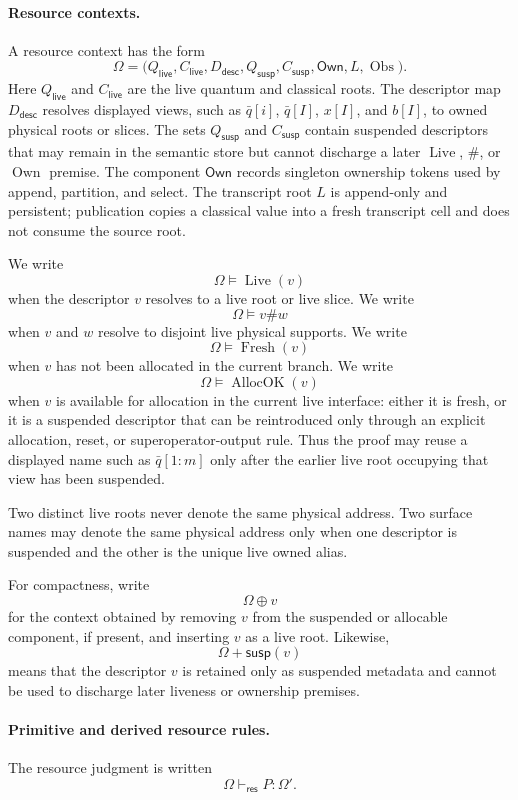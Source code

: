\documentclass{report}
\theoremstyle{defn_style}
\providecommand{\Live}{\operatorname{Live}}
\providecommand{\Fresh}{\operatorname{Fresh}}
\providecommand{\AllocOK}{\operatorname{AllocOK}}
\providecommand{\Own}{\operatorname{Own}}
\providecommand{\Obs}{\operatorname{Obs}}
\providecommand{\susp}{\mathsf{susp}}
\begin{document}
\paragraph{Resource contexts.}
A resource context has the form
\[
\Omega =
\bigl(
  Q_{\mathsf{live}},
  C_{\mathsf{live}},
  D_{\mathsf{desc}},
  Q_{\mathsf{susp}},
  C_{\mathsf{susp}},
  \mathsf{Own},
  L,
  \Obs
\bigr).
\]
Here \(Q_{\mathsf{live}}\) and \(C_{\mathsf{live}}\) are the live quantum and
classical roots.  The descriptor map \(D_{\mathsf{desc}}\) resolves displayed
views, such as \(\bar q[i]\), \(\bar q[I]\), \(x[I]\), and \(b[I]\), to owned
physical roots or slices.  The sets \(Q_{\mathsf{susp}}\) and
\(C_{\mathsf{susp}}\) contain suspended descriptors that may remain in the
semantic store but cannot discharge a later \(\Live\), \(\#\), or \(\Own\)
premise.  The component \(\mathsf{Own}\) records singleton ownership tokens used
by append, partition, and select.  The transcript root \(L\) is append-only and
persistent; publication copies a classical value into a fresh transcript cell and
does not consume the source root.

We write
\[
  \Omega \models \Live(v)
\]
when the descriptor \(v\) resolves to a live root or live slice.  We write
\[
  \Omega \models v \# w
\]
when \(v\) and \(w\) resolve to disjoint live physical supports.  We write
\[
  \Omega \models \Fresh(v)
\]
when \(v\) has not been allocated in the current branch.  We write
\[
  \Omega \models \AllocOK(v)
\]
when \(v\) is available for allocation in the current live interface: either it
is fresh, or it is a suspended descriptor that can be reintroduced only through
an explicit allocation, reset, or superoperator-output rule.  Thus the proof may
reuse a displayed name such as \(\bar q[1{:}m]\) only after the earlier live root
occupying that view has been suspended.

Two distinct live roots never denote the same physical address.  Two surface
names may denote the same physical address only when one descriptor is suspended
and the other is the unique live owned alias.

For compactness, write
\[
  \Omega\oplus v
\]
for the context obtained by removing \(v\) from the suspended or allocable
component, if present, and inserting \(v\) as a live root.  Likewise,
\[
  \Omega+\susp(v)
\]
means that the descriptor \(v\) is retained only as suspended metadata and cannot
be used to discharge later liveness or ownership premises.

\paragraph{Primitive and derived resource rules.}
The resource judgment is written
\[
  \Omega\vdash_{\mathsf{res}} P:\Omega' .
\]
\end{document}
